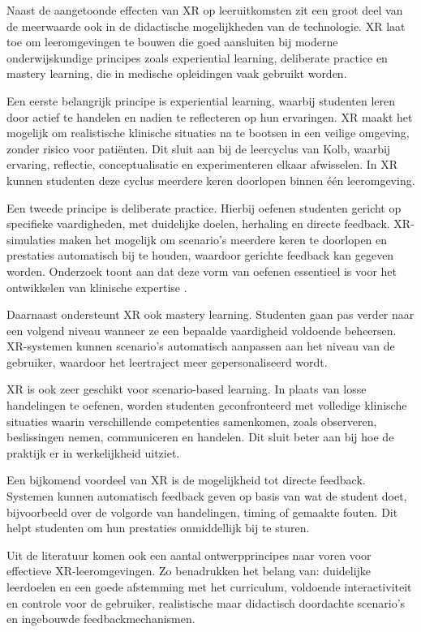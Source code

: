 Naast de aangetoonde effecten van XR op leeruitkomsten zit een groot deel van de meerwaarde ook in de didactische mogelijkheden van de technologie. XR laat toe om leeromgevingen te bouwen die goed aansluiten bij moderne onderwijskundige principes zoals experiential learning, deliberate practice en mastery learning, die in medische opleidingen vaak gebruikt worden.

Een eerste belangrijk principe is experiential learning, waarbij studenten leren door actief te handelen en nadien te reflecteren op hun ervaringen. XR maakt het mogelijk om realistische klinische situaties na te bootsen in een veilige omgeving, zonder risico voor patiënten. Dit sluit aan bij de leercyclus van Kolb, waarbij ervaring, reflectie, conceptualisatie en experimenteren elkaar afwisselen. In XR kunnen studenten deze cyclus meerdere keren doorlopen binnen één leeromgeving.

Een tweede principe is deliberate practice. Hierbij oefenen studenten gericht op specifieke vaardigheden, met duidelijke doelen, herhaling en directe feedback. XR-simulaties maken het mogelijk om scenario’s meerdere keren te doorlopen en prestaties automatisch bij te houden, waardoor gerichte feedback kan gegeven worden. Onderzoek toont aan dat deze vorm van oefenen essentieel is voor het ontwikkelen van klinische expertise \autocite{Ericsson2004Deliberate}.

Daarnaast ondersteunt XR ook mastery learning. Studenten gaan pas verder naar een volgend niveau wanneer ze een bepaalde vaardigheid voldoende beheersen. XR-systemen kunnen scenario’s automatisch aanpassen aan het niveau van de gebruiker, waardoor het leertraject meer gepersonaliseerd wordt.

XR is ook zeer geschikt voor scenario-based learning. In plaats van losse handelingen te oefenen, worden studenten geconfronteerd met volledige klinische situaties waarin verschillende competenties samenkomen, zoals observeren, beslissingen nemen, communiceren en handelen. Dit sluit beter aan bij hoe de praktijk er in werkelijkheid uitziet.

Een bijkomend voordeel van XR is de mogelijkheid tot directe feedback. Systemen kunnen automatisch feedback geven op basis van wat de student doet, bijvoorbeeld over de volgorde van handelingen, timing of gemaakte fouten. Dit helpt studenten om hun prestaties onmiddellijk bij te sturen.

Uit de literatuur komen ook een aantal ontwerpprincipes naar voren voor effectieve XR-leeromgevingen. Zo benadrukken \textcite{Radianti2020VRHE} het belang van:
duidelijke leerdoelen en een goede afstemming met het curriculum, voldoende interactiviteit en controle voor de gebruiker, realistische maar didactisch doordachte scenario’s en ingebouwde feedbackmechanismen.

